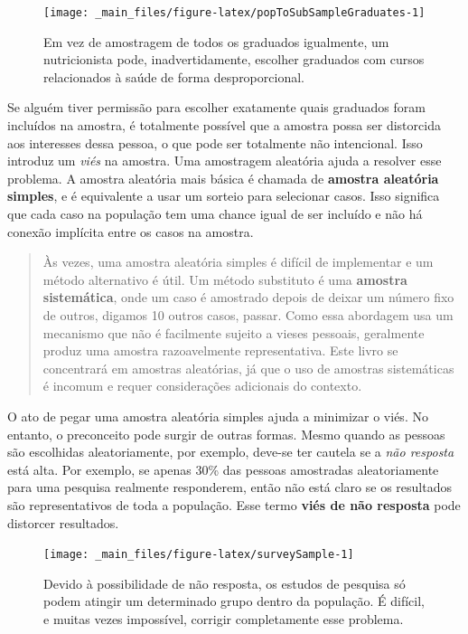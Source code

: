 \documentclass[
]{book}
\theoremstyle{definition}
\theoremstyle{definition}
\theoremstyle{definition}
\theoremstyle{definition}
\theoremstyle{remark}
\begin{document}
\begin{figure}
\texttt{[image: \_main\_files/figure-latex/popToSubSampleGraduates-1]} \caption{Em vez de amostragem de todos os graduados igualmente, um nutricionista pode, inadvertidamente, escolher graduados com cursos relacionados à saúde de forma desproporcional.}\label{fig:popToSubSampleGraduates}
\end{figure}

Se alguém tiver permissão para escolher exatamente quais graduados foram incluídos na amostra, é totalmente possível que a amostra possa ser distorcida aos interesses dessa pessoa, o que pode ser totalmente não intencional. Isso introduz um \emph{viés} na amostra. Uma amostragem aleatória ajuda a resolver esse problema. A amostra aleatória mais básica é chamada de \textbf{amostra aleatória simples}, e é equivalente a usar um sorteio para selecionar casos. Isso significa que cada caso na população tem uma chance igual de ser incluído e não há conexão implícita entre os casos na amostra.

\begin{quote}
Às vezes, uma amostra aleatória simples é difícil de implementar e um método alternativo é útil. Um método substituto é uma \textbf{amostra sistemática}, onde um caso é amostrado depois de deixar um número fixo de outros, digamos 10 outros casos, passar. Como essa abordagem usa um mecanismo que não é facilmente sujeito a vieses pessoais, geralmente produz uma amostra razoavelmente representativa. Este livro se concentrará em amostras aleatórias, já que o uso de amostras sistemáticas é incomum e requer considerações adicionais do contexto.
\end{quote}

O ato de pegar uma amostra aleatória simples ajuda a minimizar o viés. No entanto, o preconceito pode surgir de outras formas. Mesmo quando as pessoas são escolhidas aleatoriamente, por exemplo, deve-se ter cautela se a \emph{não resposta} está alta. Por exemplo, se apenas 30\% das pessoas amostradas aleatoriamente para uma pesquisa realmente responderem, então não está claro se os resultados são representativos de toda a população. Esse termo \textbf{viés de não resposta} pode distorcer resultados.

\begin{figure}
\texttt{[image: \_main\_files/figure-latex/surveySample-1]} \caption{Devido à possibilidade de não resposta, os estudos de pesquisa só podem atingir um determinado grupo dentro da população. É difícil, e muitas vezes impossível, corrigir completamente esse problema.}\label{fig:surveySample}
\end{figure}
\end{document}
